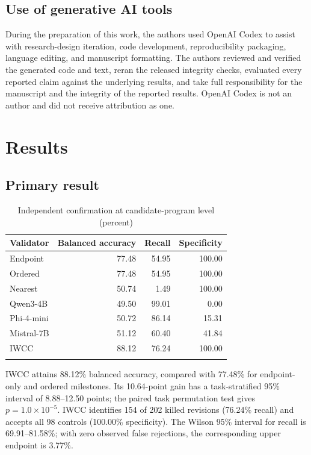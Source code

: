 \documentclass[pdflatex,sn-basic]{sn-jnl}
\newcommand{\ControlCount}{98}
\newcommand{\IWCCBA}{88.12}
\newcommand{\EndpointBA}{77.48}
\newcommand{\GainPoints}{10.64}
\newcommand{\GainCILow}{8.88}
\newcommand{\GainCIHigh}{12.50}
\newcommand{\PermutationP}{1.0\times10^{-5}}
\newcommand{\IWCCRecall}{76.24}
\newcommand{\IWCCSpecificity}{100.00}
\begin{document}
\subsection{Use of generative AI tools}
During the preparation of this work, the authors used OpenAI Codex to assist
with research-design iteration, code development, reproducibility packaging,
language editing, and manuscript formatting. The authors reviewed and verified
the generated code and text, reran the released integrity checks, evaluated
every reported claim against the underlying results, and take full
responsibility for the manuscript and the integrity of the reported results.
OpenAI Codex is not an author and did not receive attribution as one.

\section{Results}
\subsection{Primary result}
\begin{table}[t]
\caption{Independent confirmation at candidate-program level (percent)}
\label{tab:main}
\centering
\begin{tabular}{lrrr}
\toprule
Validator & Balanced accuracy & Recall & Specificity \\
\midrule
Endpoint & 77.48 & 54.95 & 100.00 \\
Ordered & 77.48 & 54.95 & 100.00 \\
Nearest & 50.74 & 1.49 & 100.00 \\
Qwen3-4B & 49.50 & 99.01 & 0.00 \\
Phi-4-mini & 50.72 & 86.14 & 15.31 \\
Mistral-7B & 51.12 & 60.40 & 41.84 \\
IWCC & 88.12 & 76.24 & 100.00 \\
\botrule
\end{tabular}
\end{table}

IWCC attains \IWCCBA\% balanced accuracy, compared with \EndpointBA\% for endpoint-only and ordered milestones. Its \GainPoints-point gain has a task-stratified 95\% interval of \GainCILow--\GainCIHigh{} points; the paired task permutation test gives $p=\PermutationP$. IWCC identifies 154 of 202 killed revisions (\IWCCRecall\% recall) and accepts all \ControlCount{} controls (\IWCCSpecificity\% specificity). The Wilson 95\% interval for recall is 69.91--81.58\%; with zero observed false rejections, the corresponding upper endpoint is 3.77\%.
\end{document}
